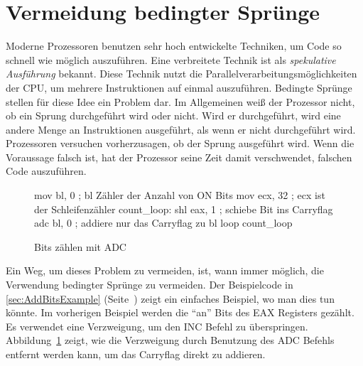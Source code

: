 \section{Vermeidung bedingter Spr\"{u}nge}

Moderne Prozessoren benutzen sehr hoch entwickelte Techniken, um
Code so schnell wie m\"{o}glich auszuf\"{u}hren. Eine verbreitete Technik
ist als \emph{spekulative Ausf\"{u}hrung} 
bekannt. Diese Technik nutzt die Parallelverarbeitungsm\"{o}glichkeiten
der CPU, um mehrere Instruktionen auf einmal auszuf\"{u}hren. Bedingte
Spr\"{u}nge stellen f\"{u}r diese Idee ein Problem dar. Im Allgemeinen wei{\ss}
der Prozessor nicht, ob ein Sprung durchgef\"{u}hrt wird oder nicht.
Wird er durchgef\"{u}hrt, wird eine andere Menge an Instruktionen
ausgef\"{u}hrt, als wenn er nicht durchgef\"{u}hrt wird. Prozessoren
versuchen vorherzusagen, ob der Sprung ausgef\"{u}hrt wird. Wenn die
Voraussage falsch ist, hat der Prozessor seine Zeit damit
verschwendet, falschen Code auszuf\"{u}hren. 

\begin{figure}[ht]
\begin{AsmCodeListing}[numbers=left, commandchars=\\\{\}]
      mov    bl, 0            ; bl Z\"{a}hler der Anzahl von ON Bits
      mov    ecx, 32          ; ecx ist der Schleifenz\"{a}hler
 count_loop:
      shl    eax, 1           ; schiebe Bit ins Carryflag
      adc    bl, 0            ; addiere nur das Carryflag zu bl
      loop   count_loop
\end{AsmCodeListing}
\caption{Bits z\"{a}hlen mit {\code ADC}\label{fig:countBitsAdc}}
\end{figure}

Ein Weg, um dieses Problem zu vermeiden, ist, wann immer m\"{o}glich,
die Verwendung bedingter Spr\"{u}nge zu vermeiden. Der Beispielcode in
\ref{sec:AddBitsExample} (Seite~\pageref{sec:AddBitsExample}) zeigt
ein einfaches Beispiel, wo man dies tun k\"{o}nnte. Im vorherigen
Beispiel werden die "`an"' Bits des EAX Registers gez\"{a}hlt. Es
verwendet eine Verzweigung, um den {\code INC} Befehl zu
\"{u}berspringen. Abbildung~\ref{fig:countBitsAdc} zeigt, wie die
Verzweigung durch Benutzung des {\code ADC}
 Befehls entfernt werden kann, um das
Carryflag direkt zu addieren.

